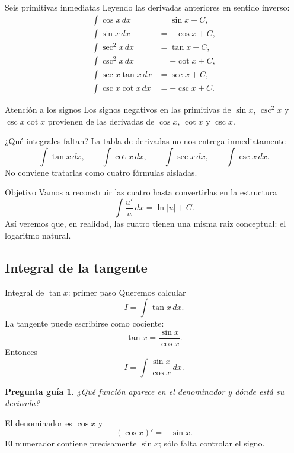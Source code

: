 \documentclass[10pt,aspectratio=169]{beamer}
\newtheorem{pregunta}{Pregunta guía}
\begin{document}
\begin{frame}{Seis primitivas inmediatas}
\small
Leyendo las derivadas anteriores en sentido inverso:
\[
\boxed{
\begin{aligned}
\int \cos x\,dx&=\sin x+C,\\
\int \sin x\,dx&=-\cos x+C,\\
\int \sec^2x\,dx&=\tan x+C,\\
\int \csc^2x\,dx&=-\cot x+C,\\
\int \sec x\tan x\,dx&=\sec x+C,\\
\int \csc x\cot x\,dx&=-\csc x+C.
\end{aligned}}
\]
\begin{alertblock}{Atención a los signos}
Los signos negativos en las primitivas de $\sin x$, $\csc^2x$ y $\csc x\cot x$ provienen de las derivadas de $\cos x$, $\cot x$ y $\csc x$.
\end{alertblock}
\end{frame}

\begin{frame}{¿Qué integrales faltan?}
La tabla de derivadas no nos entrega inmediatamente
\[
\boxed{
\int\tan x\,dx,\qquad
\int\cot x\,dx,\qquad
\int\sec x\,dx,\qquad
\int\csc x\,dx.}
\]
No conviene tratarlas como cuatro fórmulas aisladas.
\vspace{2mm}
\begin{block}{Objetivo}
Vamos a reconstruir las cuatro hasta convertirlas en la estructura
\[
\boxed{\int\frac{u'}{u}\,dx=\ln|u|+C.}
\]
Así veremos que, en realidad, las cuatro tienen una misma raíz conceptual: el logaritmo natural.
\end{block}
\end{frame}

\subsection{Integral de la tangente}
\begin{frame}{Integral de $\tan x$: primer paso}
Queremos calcular
\[
I=\int\tan x\,dx.
\]
La tangente puede escribirse como cociente:
\[
\tan x=\frac{\sin x}{\cos x}.
\]
Entonces
\[
I=\int\frac{\sin x}{\cos x}\,dx.
\]
\begin{pregunta}
¿Qué función aparece en el denominador y dónde está su derivada?
\end{pregunta}
El denominador es $\cos x$ y
\[
(\cos x)'=-\sin x.
\]
El numerador contiene precisamente $\sin x$; sólo falta controlar el signo.
\end{frame}
\end{document}
